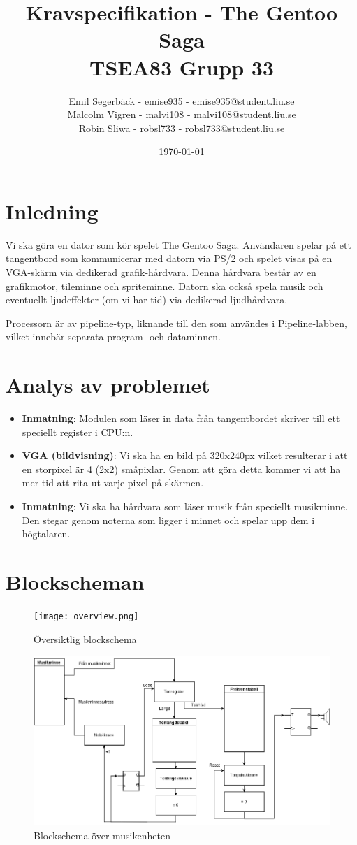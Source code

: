 \documentclass[a4paper,titlepage]{article}
\title{
\textbf{Kravspecifikation - The Gentoo Saga} \\
\large TSEA83 Grupp 33}
\date{\today}
\author{
        Emil Segerbäck - emise935 - emise935@student.liu.se\\
		Malcolm Vigren - malvi108 - malvi108@student.liu.se \\
		Robin Sliwa - robsl733 - robsl733@student.liu.se }
\begin{document}
    \maketitle
    \newpage
\tableofcontents
    \newpage

\section{Inledning}
Vi ska göra en dator som kör spelet The Gentoo Saga. Användaren spelar på ett
tangentbord som kommunicerar med datorn via PS/2 och spelet visas på en
VGA-skärm via dedikerad grafik-hårdvara. Denna hårdvara består av en
grafikmotor, tileminne och spriteminne. Datorn ska också spela musik och
eventuellt ljudeffekter (om vi har tid) via dedikerad ljudhårdvara.

Processorn är av pipeline-typ, liknande till den som användes i
Pipeline-labben, vilket innebär separata program- och dataminnen. 
\section{Analys av problemet}
\begin{itemize}
	\item \textbf{Inmatning}: Modulen som läser in data från tangentbordet
		skriver till ett speciellt register i CPU:n.
	\item \textbf{VGA (bildvisning)}: Vi ska ha en bild på 320x240px vilket
		resulterar i att en storpixel är 4 (2x2) småpixlar. Genom att göra
		detta kommer vi att ha mer tid att rita ut varje pixel på skärmen. 
	\item \textbf{Inmatning}: Vi ska ha hårdvara som läser musik från speciellt
		musikminne. Den stegar genom noterna som ligger i minnet och spelar upp
		dem i högtalaren.
\end{itemize}
\newpage
\section{Blockscheman}
\begin{figure}[h!]
	\centering
	\texttt{[image: overview.png]}
	\caption{Översiktlig blockschema}
\end{figure}

\begin{figure}[h!]
	\centering
\includegraphics[width=14cm]{Musik.png}
	\caption{Blockschema över musikenheten}
\end{figure}
\end{document}
